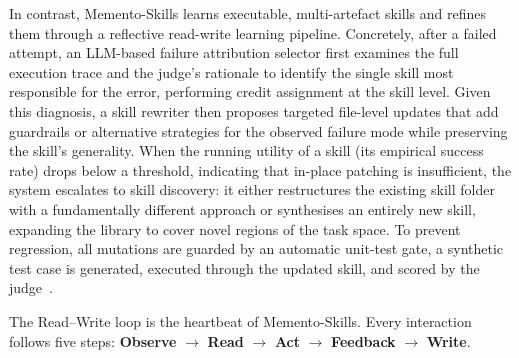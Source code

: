 \documentclass[11pt,a4paper]{article}
\begin{document}
In contrast, Memento-Skills learns executable, multi-artefact skills and refines them through a reflective read-write learning pipeline. Concretely, after a failed attempt, an LLM-based failure attribution selector first examines the full execution trace and the judge's rationale to identify the single skill most responsible for the error, performing credit assignment at the skill level. Given this diagnosis, a skill rewriter then proposes targeted file-level updates that add guardrails or alternative strategies for the observed failure mode while preserving the skill's generality. When the running utility of a skill (its empirical success rate) drops below a threshold, indicating that in-place patching is insufficient, the system escalates to skill discovery: it either restructures the existing skill folder with a fundamentally different approach or synthesises an entirely new skill, expanding the library to cover novel regions of the task space. To prevent regression, all mutations are guarded by an automatic unit-test gate, a synthetic test case is generated, executed through the updated skill, and scored by the judge~\cite{zheng2023judging}.



\begin{insightbox}
The Read--Write loop is the heartbeat of Memento-Skills. Every interaction follows five steps: \textbf{Observe} $\to$ \textbf{Read} $\to$ \textbf{Act} $\to$ \textbf{Feedback} $\to$ \textbf{Write}.
\end{insightbox}
\end{document}

